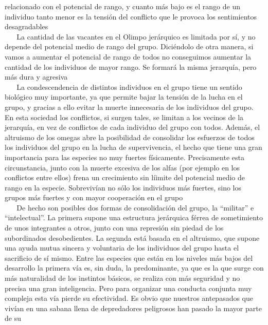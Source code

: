 relacionado con el potencial de rango, y cuanto más bajo es el rango de
un individuo tanto menor es la tensión del conflicto que le provoca los
sentimientos desagradables\\
\hspace*{0.333em} ~ ~ La cantidad de las vacantes en el Olimpo
jerárquico es limitada por sí, y no depende del potencial medio de rango
del grupo. Diciéndolo de otra manera, si vamos a aumentar el potencial
de rango de todos no conseguimos aumentar la cantidad de los individuos
de mayor rango. Se formará la misma jerarquía, pero más dura y
agresiva\\
\hspace*{0.333em} ~ ~ La condescendencia de distintos individuos en el
grupo tiene un sentido biológico muy importante, ya que permite bajar la
tensión de la lucha en el grupo, y gracias a ello evitar la muerte
innecesaria de los individuos del grupo. En esta sociedad los
conflictos, si surgen tales, se limitan a los vecinos de la jerarquía,
en vez de conflictos de cada individuo del grupo con todos. Además, el
altruismo de los omegas abre la posibilidad de consolidar los esfuerzos
de todos los individuos del grupo en la lucha de supervivencia, el hecho
que tiene una gran importancia para las especies no muy fuertes
físicamente. Precisamente esta circunstancia, junto con la muerte
excesiva de los alfas (por ejemplo en los conflictos entre ellos) frena
un crecimiento sin líimite del potencial medio de rango en la especie.
Sobrevivían no sólo los individuos más fuertes, sino los grupos más
fuertes y con mayor cooperación en el grupo\\
\hspace*{0.333em} ~ ~ De hecho son posibles dos formas de consolidación
del grupo, la ``militar'' e ``intelectual''. La primera supone una
estructura jerárquica férrea de sometimiento de unos integrantes a
otros, junto con una represión sin piedad de los subordinados
desobedientes. La segunda está basada en el altruismo, que supone una
ayuda mutua sincera y voluntaria de los individuos del grupo hasta el
sacrificio de sí mismo. Entre las especies que están en los niveles más
bajos del desarrollo la primera vía es, sin duda, la predominante, ya
que es la que surge con más naturalidad de los instintos básicos, se
realiza con más seguridad y no precisa una gran inteligencia. Pero para
organizar una conducta conjunta muy compleja esta vía pierde su
efectividad. Es obvio que nuestros antepasados que vivían en una sabana
llena de depredadores peligrosos han pasado la mayor parte de su
